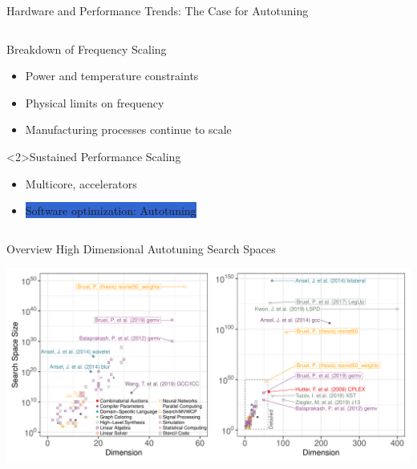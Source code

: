 \documentclass[10pt, compress, aspectratio=169, xcolor={table,usenames,dvipsnames}]{beamer}
\begin{document}
\begin{frame}[label={sec:orga34e24f}]{Hardware and Performance Trends: The Case for Autotuning}
\begin{columns}
\begin{column}{0.5\columnwidth}
\begin{block}{Breakdown of Frequency Scaling}
\begin{itemize}
\item Power and temperature constraints
\item Physical limits on frequency
\item Manufacturing processes continue to scale
\end{itemize}

\begin{block}<2>{Sustained Performance Scaling}
\begin{itemize}
\item Multicore, accelerators
\item \colorbox{Highlight}{Software optimization: \alert{Autotuning}}
\end{itemize}
\end{block}
\end{block}
\end{column}
\end{columns}
\end{frame}
\begin{frame}[label={sec:orgd1ebbf4}]{Overview High Dimensional Autotuning Search Spaces}
\begin{center}
\includegraphics[width=\columnwidth]{../../../img/search_spaces.pdf}
\end{center}
\end{frame}
\end{document}
